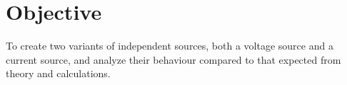 \section{Objective}\label{sec:objective}
To create two variants of independent sources, both a voltage source and a current source, and analyze their behaviour compared to that expected from theory and calculations.
